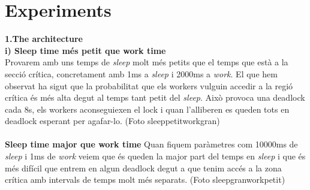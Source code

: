 \documentclass[a4paper, 10pt]{article}
\begin{document}
\section{Experiments}
\begin{itemize}
\textbf{1.The architecture}\\
\textbf{i) Sleep time més petit que work time}\\
Provarem amb uns temps de \textit{sleep} molt més petits que el temps que està a la secció crítica, concretament amb 1ms a \textit{sleep} i 2000ms a \textit{work}. El que hem observat ha sigut que la probabilitat que els workers vulguin accedir a la regió crítica és més alta degut al temps tant petit del \textit{sleep}. Això provoca una deadlock cada 8s, els workers aconseguiexen el lock i quan l'alliberen es queden tots en deadlock esperant per agafar-lo. (Foto sleeppetitworkgran)\\
\\
\textbf{Sleep time major que work time}
Quan fiquem paràmetres com 10000ms de \textit{sleep} i 1ms de \textit{work} veiem que és queden la major part del temps en \textit{sleep} i que és més difícil que entrem en algun deadlock degut a que tenim accés a la zona crítica amb intervals de temps molt més separats. (Foto sleepgranworkpetit)\\
\\


\end{itemize}
\end{document}
